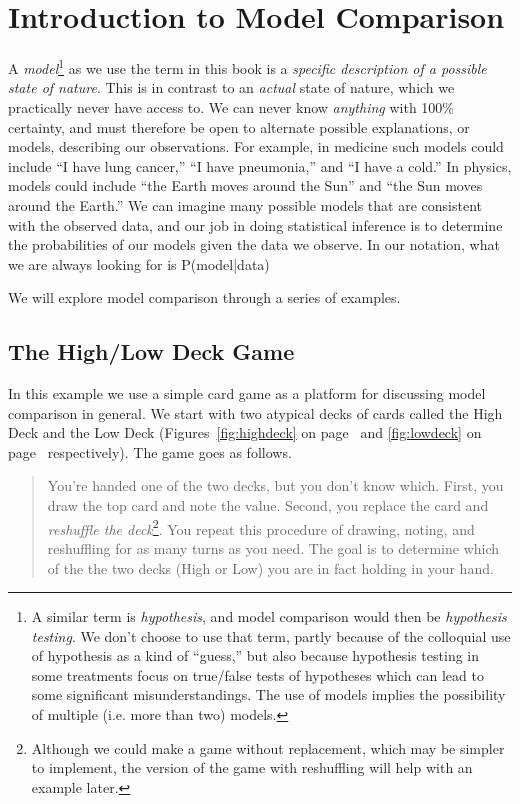 \chapter{Introduction to Model Comparison}\label{ch:model1}

A {\em model}\footnote{A similar term is {\em hypothesis}, and model comparison would then be {\em hypothesis testing}.  We don't choose to use that term, partly because of the colloquial use of hypothesis as a kind of ``guess,'' but also because hypothesis testing in some treatments focus on true/false tests of hypotheses which can lead to some significant misunderstandings.  The use of models implies the possibility of multiple (i.e. more than two) models.} as we use the term in this book is a {\em specific description of a possible state of nature}.  This is in contrast to an {\em actual} state of nature, which we practically never have access to.  We can never know {\em anything} with 100\% certainty, and must therefore be open to alternate possible explanations, or models, describing our observations.  For example, in medicine such models could include ``I have lung cancer,'' ``I have pneumonia,'' and ``I have a cold.''  In physics, models could include ``the Earth moves around the Sun'' and ``the Sun moves around the Earth.'' We can imagine many possible models that are consistent with the observed data, and our job in doing statistical inference is to determine the probabilities of our models given the data we observe.  In our notation, what we are always looking for is
\beq
P({\rm model}|{\rm data})
\label{eq:model_given_data}
\eeq

We will explore model comparison through a series of examples.


\section{The High/Low Deck Game}\label{sec:highlowdeck}

In this example we use a simple card game as a platform for discussing model comparison in general.  We start with two atypical decks of cards called the High Deck and the Low Deck (Figures~\ref{fig:highdeck} on page~\pageref{fig:highdeck} and \ref{fig:lowdeck} on page~\pageref{fig:lowdeck} respectively).  The game goes as follows. 
\begin{quote}
You're handed one of the two decks, but you don't know which.  First, you draw the top card and note the value.  Second, you replace the card and {\em reshuffle the deck}\footnote{Although we could make a game without replacement, which may be simpler to implement, the version of the game with reshuffling will help with an example later.}.  You repeat this procedure of drawing, noting, and reshuffling for as many turns as you need.  The goal is to determine which of the the two decks (High or Low) you are in fact holding in your hand.
\end{quote}


